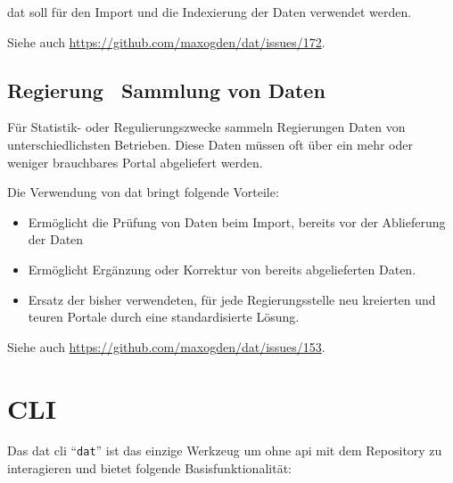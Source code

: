 dat soll für den Import und die Indexierung der Daten verwendet werden.

Siehe auch \url{https://github.com/maxogden/dat/issues/172}.

\subsection{Regierung \textendash\ Sammlung von Daten} %
Für Statistik- oder Regulierungszwecke sammeln Regierungen Daten von unterschiedlichsten Betrieben. Diese Daten müssen oft über ein mehr oder weniger brauchbares Portal abgeliefert werden.

Die Verwendung von dat bringt folgende Vorteile:
\begin{itemize}
\item Ermöglicht die Prüfung von Daten beim Import, bereits vor der Ablieferung der Daten
\item Ermöglicht Ergänzung oder Korrektur von bereits abgelieferten Daten.
\item Ersatz der bisher verwendeten, für jede Regierungsstelle neu kreierten und teuren Portale durch eine standardisierte Lösung.
\end{itemize}

Siehe auch \url{https://github.com/maxogden/dat/issues/153}.

\section{CLI}


Das \gls{dat} \gls{cli} ``\texttt{dat}'' ist das einzige Werkzeug um ohne \acs{api} mit dem Repository zu interagieren und bietet folgende Basisfunktionalität:


